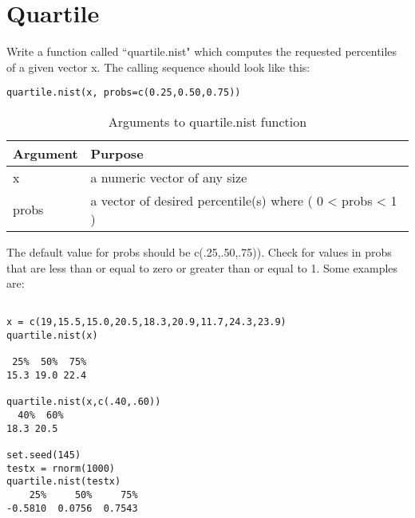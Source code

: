 \documentclass{article}
\begin{document}
\section{Quartile}
Write a function called ``quartile.nist" which computes the requested percentiles of a given vector x. The calling sequence should look like this:
\begin{verbatim}
quartile.nist(x, probs=c(0.25,0.50,0.75))
\end{verbatim}

\begin{table}[ht]
\caption{Arguments to quartile.nist function}
\begin{tabular}{l | l}
\hline\hline
Argument & Purpose \\ [1ex]
\hline
x & a numeric vector of any size \\ [1ex]
\hline 
probs & a vector of desired percentile(s) where ( 0 < probs < 1 ) \\ 
\hline
\end{tabular}
\label{table:nonlin}
\end{table}

The default value for probs should be c(.25,.50,.75)). Check for values in probs that are less than or equal to zero or greater than or equal to 1. Some examples are:
\begin{verbatim}

x = c(19,15.5,15.0,20.5,18.3,20.9,11.7,24.3,23.9)
quartile.nist(x)

 25%  50%  75% 
15.3 19.0 22.4

quartile.nist(x,c(.40,.60))
  40%  60% 
18.3 20.5 

set.seed(145)
testx = rnorm(1000)
quartile.nist(testx)
    25%     50%     75% 
-0.5810  0.0756  0.7543

\end{verbatim}
\end{document}
